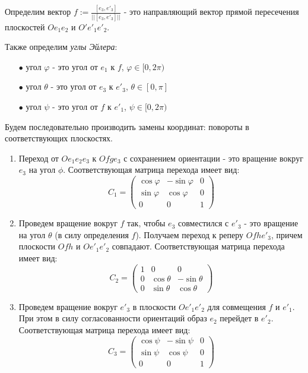 Определим вектор $f := \frac{[e_3, e'_3]}{||[e_3, e'_3]||}$ - это направляющий вектор прямой пересечения плоскостей $O e_1 e_2$ и $O' e'_1 e'_2$.

Также определим \textit{углы Эйлера}:
\begin{itemize}
	\item[$\bullet$] угол $\varphi$ - это угол от $e_1$ к $f$, $\varphi \in [0, 2\pi)$
	\item[$\bullet$] угол $\theta$ - это угол от $e_3$ к $e'_3$, $\theta \in [0, \pi]$
	\item[$\bullet$] угол $\psi$ - это угол от $f$ к $e'_1$, $\psi \in [0, 2\pi)$
\end{itemize}

Будем последовательно производить замены координат: повороты в соответствующих плоскостях.

\begin{enumerate}
	\item Переход от $O e_1 e_2 e_3$ к $O f g e_3$ с сохранением ориентации - это вращение вокруг $e_3$ на угол $\phi$. Соответствующая матрица перехода имеет вид:
	$$C_1 = \begin{pmatrix}
		\cos \varphi & -\sin \varphi & 0 \\
		\sin \varphi & \cos \varphi & 0 \\
		0 & 0 & 1
	\end{pmatrix}$$
	\item Проведем вращение вокруг $f$ так, чтобы $e_3$ совместился с $e'_3$ - это вращение на угол $\theta$ (в силу определения $f$). Получаем переход к реперу $O f h e'_3$, причем плоскости $O f h$ и $O e'_1 e'_2$ совпадают. Соответствующая матрица перехода имеет вид:
	$$C_2 = \begin{pmatrix}
		1 & 0 & 0 \\
		0 &\cos \theta & -\sin \theta\\
		0 & \sin \theta & \cos \theta
	\end{pmatrix}$$
	\item Проведем вращение вокруг $e'_3$ в плоскости $O e'_1 e'_2$ для совмещения $f$ и $e'_1$. При этом в силу согласованности ориентаций образ $e_2$ перейдет в $e'_2$.
	Соответствующая матрица перехода имеет вид:
	$$C_3 = \begin{pmatrix}
		\cos \psi & -\sin \psi & 0 \\
		\sin \psi & \cos \psi & 0 \\
		0 & 0 & 1
	\end{pmatrix}$$
\end{enumerate}

